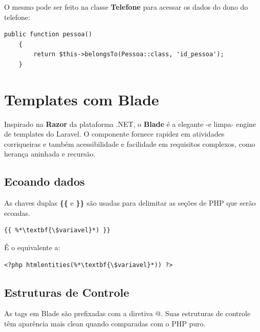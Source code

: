 \documentclass[
12pt,				%
openany,			%
twoside,			%
a4paper,			%
english,			%
french,				%
spanish,			%
brazil,				%
]{abntex2}
\begin{document}
O mesmo pode ser feito na classe \textbf{Telefone} para acessar os dados do dono do telefone:

\begin{lstlisting}[style=php,caption={\textit{app/Telefone.php}}]
    public function pessoa() 
    {
        return $this->belongsTo(Pessoa::class, 'id_pessoa');
    }
\end{lstlisting}

\section{Templates com Blade}

Inspirado na \textbf{Razor} da plataforma .NET, o \textbf{Blade} é a elegante -e limpa- engine de templates
do Laravel. O componente fornece rapidez em atividades corriqueiras e também acessibilidade e facilidade em requisitos complexos, como herança aninhada e recursão.

\subsection{Ecoando dados}

As chaves duplas \textbf{\{\{} e \textbf{\}\}} são usadas para delimitar as seções de PHP que serão ecoadas.

\begin{lstlisting}[style=common,caption={Ecoando uma variável}]
    {{ %*\textbf{\$variavel}*) }}
\end{lstlisting}

É o equivalente a:

\begin{lstlisting}[style=common,caption={Ecoando uma variável em PHP puro}]
    <?php htmlentities(%*\textbf{\$variavel}*)) ?> 
\end{lstlisting}

\subsection{Estruturas de Controle}
As tags em Blade são prefixadas com a diretiva @. Suas estruturas de controle têm aparência mais clean quando comparadas com o PHP puro.
\end{document}
